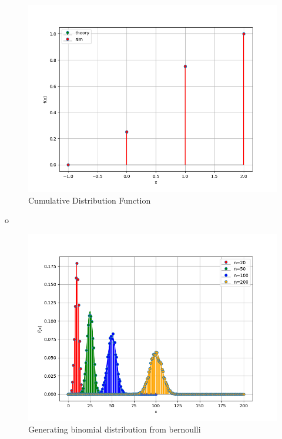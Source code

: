 \documentclass[journal]{IEEEtran}
\begin{document}
\begin{figure}[h!]
   \centering
   \includegraphics[width=0.7\columnwidth]{figs/fig2.png}
    \caption{Cumulative Distribution Function}
\end{figure}
o
\begin{figure}[h!]
   \centering
   \includegraphics[width=0.7\columnwidth]{figs/binomial.png}
    \caption{Generating binomial distribution from bernoulli}
\end{figure}
\end{document}

